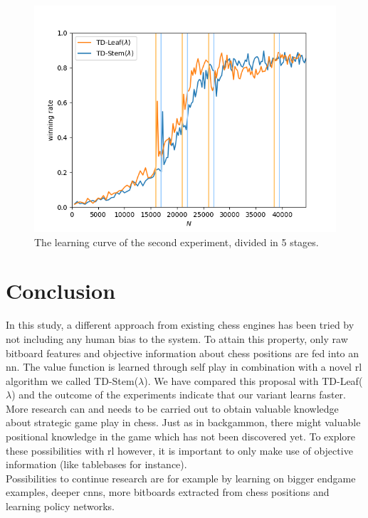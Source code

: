 \documentclass[twocolumn]{phdsymp} %
\begin{document}
\begin{figure}
\centering
\includegraphics[scale=0.5]{plots/kqk_lc}
\caption{The learning curve of the second experiment, divided in 5 stages.}
\label{fig:lc_kqk}
\end{figure}

\section{Conclusion}
\label{sec:con}

In this study, a different approach from existing chess engines has been tried by not including any human bias to the system. To attain this property, only raw bitboard features and objective information about chess positions are fed into an \gls{nn}. The value function is learned through self play in combination with a novel \gls{rl} algorithm we called TD-Stem($\lambda$). We have compared this proposal with TD-Leaf($\lambda$) and the outcome of the experiments indicate that our variant learns faster.\\

More research can and needs to be carried out to obtain valuable knowledge about strategic game play in chess. Just as in backgammon, there might valuable positional knowledge in the game which has not been discovered yet. To explore these possibilities with \gls{rl} however, it is important to only make use of objective information (like tablebases for instance).\\

Possibilities to continue research are for example by learning on bigger endgame examples, deeper \glspl{cnn}, more bitboards extracted from chess positions and learning policy networks.
\end{document}
